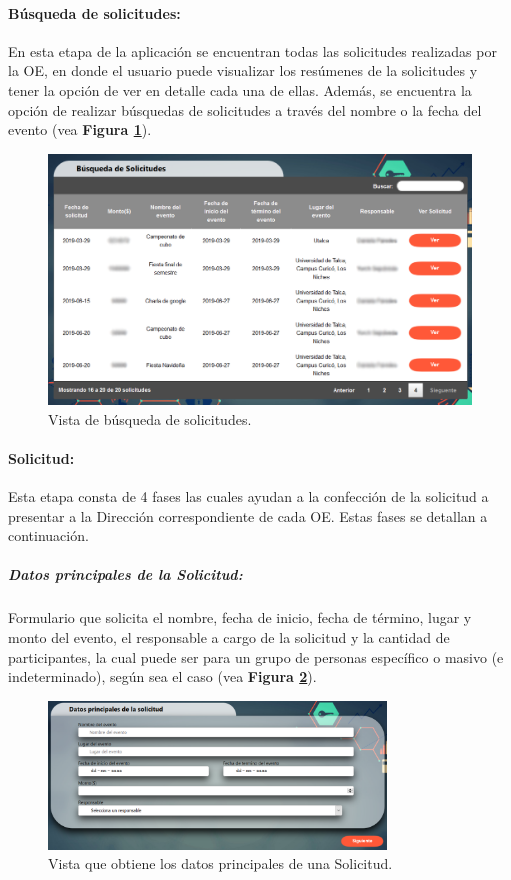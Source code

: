 \paragraph{Búsqueda de solicitudes: } En esta etapa de la aplicación se encuentran todas las solicitudes realizadas por la OE, en donde el usuario puede visualizar los resúmenes de la solicitudes y tener la opción de ver en detalle cada una de ellas. Además, se encuentra la opción de realizar búsquedas de solicitudes a través del nombre o la fecha del evento (vea \textbf{Figura \ref{fig: Busquedas}}).

\begin{figure}[h]
    \centering
    \includegraphics[width=0.69 \textwidth]{Imagenes/Busqueda.PNG}
    \caption{\label{fig: Busquedas}Vista de búsqueda de solicitudes.}
\end{figure}

\paragraph{Solicitud: }Esta etapa consta de 4 fases las cuales ayudan a la confección de la solicitud a presentar a la Dirección correspondiente de cada OE. Estas fases se detallan a continuación. 

    \subparagraph{\emph{Datos principales de la Solicitud: }} Formulario que solicita el nombre, fecha de inicio, fecha de término, lugar y monto del evento, el responsable a cargo de la solicitud y la cantidad de participantes, la cual puede ser para un grupo de personas específico o masivo (e indeterminado), según sea el caso (vea \textbf{Figura \ref{fig: DatosPrincipales}}).

    \begin{figure}[h]
        \centering
        \includegraphics[width= 0.8\textwidth]{Imagenes/DatosPrincipales.PNG}
        \caption{\label{fig: DatosPrincipales}Vista que obtiene los datos principales de una Solicitud.}
    \end{figure}

